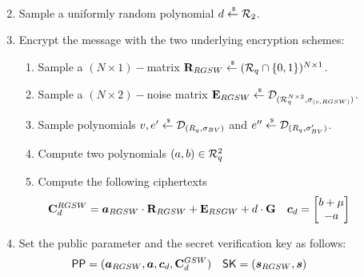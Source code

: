\begin{description}
\begin{enumerate}
\begin{enumerate}
\begin{align*}
        \end{align*}
      \end{enumerate}
    \item Sample a uniformly random polynomial $d \stackrel{{\scriptscriptstyle \mkern4mu \$}}{\gets} {\mathcal{R}}_2$.
    \item Encrypt the message with the two underlying encryption schemes:
      \begin{enumerate}
      \item Sample a $(N \times 1)-$matrix $\mathbf{R}_{RGSW} \stackrel{{\scriptscriptstyle \mkern4mu \$}}{\gets} ({\mathcal{R}}_q \cap\{0,1\})^{N \times 1}$.
      \item Sample a $(N \times 2)-$noise matrix $\mathbf{E}_{RGSW} \stackrel{{\scriptscriptstyle \mkern4mu \$}}{\gets} \mathcal{D}_{({\mathcal{R}}_q^{N \times 2}, \sigma_{(c, RGSW)})}$.
      \item Sample polynomials $v,e' \stackrel{{\scriptscriptstyle \mkern4mu \$}}{\gets} \mathcal{D}_{(R_q, \sigma_{BV})}$ and $e'' \stackrel{{\scriptscriptstyle \mkern4mu \$}}{\gets}  \mathcal{D}_{(R_q, \sigma_{BV}')}$.
      \item Compute two polynomials $(a, b) \in {\mathcal{R}}_q^2$
      \item Compute the following ciphertexts
        \begin{align*}
          \mat{C}_d^{RGSW} &= \vec{a}_{RGSW} \cdot \mat{R}_{RGSW} + \mat{E}_{RSGW} +  d \cdot \mat{G} &
          \vec{c}_d &= \begin{bmatrix} b + \mu \\ -a \end{bmatrix}
        \end{align*}
      \end{enumerate}
    \item Set the public parameter and the secret verification key as follows:
      \begin{align*}
        \PPP &= (\vec{a}_{RGSW}, \vec{a}, \vec{c}_d, \mat{C}_d^{GSW}) & \SK &= (\vec{s}_{RGSW}, \vec{s})
      \end{align*}
  \end{enumerate}




\end{description}
